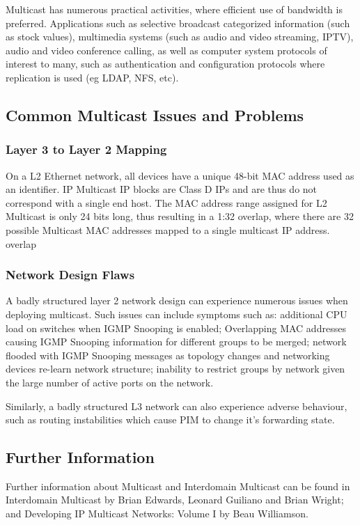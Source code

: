 Multicast has numerous practical activities, where efficient use of
bandwidth is preferred. Applications such as selective broadcast
categorized information (such as stock values), multimedia systems (such
as audio and video streaming, IPTV), audio and video conference calling, 
as well as computer system protocols of interest to many, such as
authentication and configuration protocols where replication is
used (eg LDAP, NFS, etc).

\subsection{Common Multicast Issues and Problems}

\subsubsection{Layer 3 to Layer 2 Mapping}

On a L2 Ethernet network, all devices have a unique 48-bit MAC address
used as an identifier. IP Multicast IP blocks are Class D IPs and are 
thus do not correspond with a single end host. The MAC address range
assigned for L2 Multicast is only 24 bits long, thus resulting in a 1:32
overlap, where there are 32 possible Multicast MAC addresses mapped to a 
single multicast IP address.
overlap

\subsubsection{Network Design Flaws}

A badly structured layer 2 network design can experience numerous issues
when deploying multicast. Such issues can include symptoms such as: 
additional CPU load on switches when IGMP Snooping is enabled; 
Overlapping MAC addresses causing IGMP Snooping information for 
different groups to be merged; network flooded with IGMP Snooping 
messages as topology changes and networking devices re-learn network 
structure; inability to restrict groups by network given the large
number of active ports on the network.

Similarly, a badly structured L3 network can also experience adverse 
behaviour, such as routing instabilities which cause PIM to change it's
forwarding state.

\subsection{Further Information}

Further information about Multicast and Interdomain Multicast can be
found in Interdomain Multicast by Brian Edwards, Leonard Guiliano and
Brian Wright; and Developing IP Multicast Networks: Volume I by Beau
Williamson.
